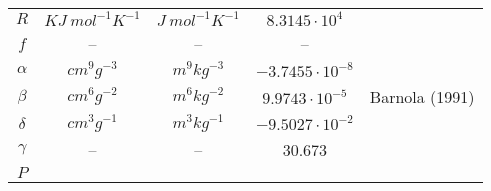 \documentclass[a4paper,11pt]{article}
\begin{document}
\begin{longtable}{|c|c|c|c|c|}
\cline{1-4}
\begin{math} R \end{math} &
\begin{math} KJ \: {mol}^{-1} K^{-1} \end{math} &
\begin{math} J \: {mol}^{-1} K^{-1} \end{math} &
\begin{math} 8.3145 \cdot 10^4 \end{math} & \\
\cline{1-4}
\begin{math}f\end{math} &
-- &
-- &
-- & \\
\cline{1-4}
\begin{math} \alpha \end{math} &
\begin{math} cm^9  g^{-3}\end{math} &
\begin{math} m^9 kg^{-3}\end{math} &
\begin{math} -3.7455 \cdot 10^{-8} \end{math} & \\
\cline{1-4}
\begin{math} \beta \end{math} &
\begin{math} cm^6g^{-2}\end{math} &
\begin{math} m^6kg^{-2}\end{math} &
\begin{math} 9.9743 \cdot 10^{-5} \end{math} & 
Barnola (1991) \cite{TEB:TEB0002}\\
\cline{1-4}
\begin{math} \delta \end{math} &
\begin{math} cm^3g^{-1}\end{math} &
\begin{math} m^3kg^{-1}\end{math} &
\begin{math} -9.5027 \cdot 10^{-2} \end{math} & \\
\cline{1-4}
\begin{math}\gamma\end{math} &
-- &
-- &
30.673 & \\
\cline{1-4}
\begin{math} P \end{math} &

\end{longtable}
\end{document}
